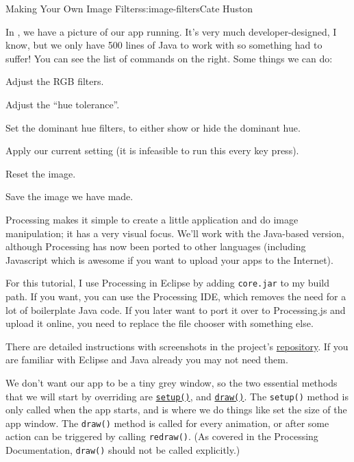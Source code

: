 \begin{aosachapter}{Making Your Own Image Filters}{s:image-filters}{Cate Huston}
\label{running-the-app}

In , we have a picture of our app
running. It's very much developer-designed, I know, but we only have 500
lines of Java to work with so something had to suffer! You can see the
list of commands on the right. Some things we can do:

\begin{aosaitemize}

\item
  Adjust the RGB filters.
\item
  Adjust the ``hue tolerance''.
\item
  Set the dominant hue filters, to either show or hide the dominant hue.
\item
  Apply our current setting (it is infeasible to run this every key
  press).
\item
  Reset the image.
\item
  Save the image we have made.
\end{aosaitemize}


Processing makes it simple to create a little application and do image
manipulation; it has a very visual focus. We'll work with the Java-based
version, although Processing has now been ported to other languages
(including Javascript which is awesome if you want to upload your apps
to the Internet).

For this tutorial, I use Processing in Eclipse by adding
\texttt{core.jar} to my build path. If you want, you can use the
Processing IDE, which removes the need for a lot of boilerplate Java
code. If you later want to port it over to Processing.js and upload it
online, you need to replace the file chooser with something else.

There are detailed instructions with screenshots in the project's
\href{https://github.com/aosabook/500lines/blob/master/image-filters/SETUP.MD}{repository}.
If you are familiar with Eclipse and Java already you may not need them.

\label{processing-basics}

\label{size-and-color}

We don't want our app to be a tiny grey window, so the two essential
methods that we will start by overriding are
\href{http://processing.org/reference/setup_.html}{\texttt{setup()}},
and \href{http://processing.org/reference/draw_.html}{\texttt{draw()}}.
The \texttt{setup()} method is only called when the app starts, and is
where we do things like set the size of the app window. The
\texttt{draw()} method is called for every animation, or after some
action can be triggered by calling \texttt{redraw()}. (As covered in the
Processing Documentation, \texttt{draw()} should not be called
explicitly.)


\end{aosachapter}
